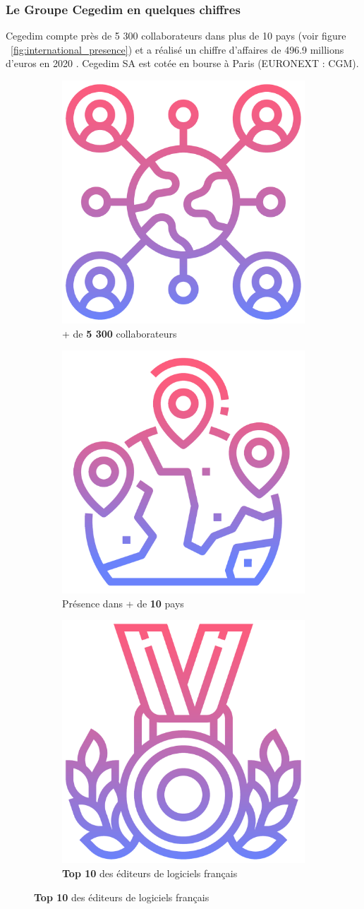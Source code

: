 \subsubsection{Le Groupe Cegedim en quelques chiffres}
Cegedim compte près de 5 300 collaborateurs dans plus de 10 pays (voir figure ~\ref{fig:international_presence}) et a réalisé un chiffre d’affaires de 496.9 millions d’euros en 2020 \cite{cegedim-ca}.
Cegedim SA est cotée en bourse à Paris (EURONEXT : CGM).
\begin{figure}[H]
    \centering
    \begin{subfigure}[t]{0.3\textwidth}
    \centering
        \includegraphics[height=0.28\textwidth]{images/sec1/social-network (1).pdf}
        \caption*{\centering + de \textbf{5 300} collaborateurs}
    \end{subfigure}
   \par\bigskip
    \begin{subfigure}[t]{0.3\textwidth}
    \centering
        \includegraphics[height=0.28\textwidth]{images/sec1/connection.pdf}
        \caption*{Présence dans + de \textbf{10} pays}
    \end{subfigure}
    \hfill
    \begin{subfigure}[t]{0.3\textwidth}
    \centering
        \includegraphics[height=0.28\textwidth]{images/sec1/medal (1).pdf}
        \caption*{\centering \textbf{Top 10} des éditeurs de logiciels français\protect\footnotemark}

\end{subfigure}
\end{figure}
